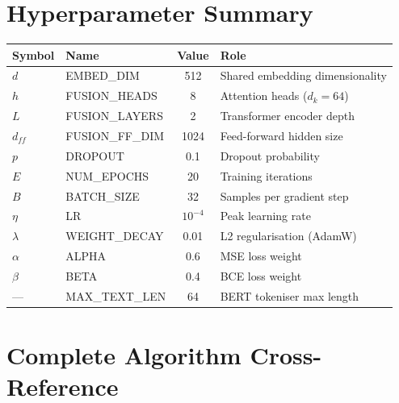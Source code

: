 \documentclass[12pt,a4paper]{article}
\theoremstyle{definition}
\begin{document}
\section{Hyperparameter Summary}

\begin{center}
\begin{tabular}{llcl}
\toprule
\textbf{Symbol} & \textbf{Name} & \textbf{Value} & \textbf{Role} \\
\midrule
$d$ & EMBED\_DIM & 512 & Shared embedding dimensionality \\
$h$ & FUSION\_HEADS & 8 & Attention heads ($d_k = 64$) \\
$L$ & FUSION\_LAYERS & 2 & Transformer encoder depth \\
$d_{ff}$ & FUSION\_FF\_DIM & 1024 & Feed-forward hidden size \\
$p$ & DROPOUT & 0.1 & Dropout probability \\
$E$ & NUM\_EPOCHS & 20 & Training iterations \\
$B$ & BATCH\_SIZE & 32 & Samples per gradient step \\
$\eta$ & LR & $10^{-4}$ & Peak learning rate \\
$\lambda$ & WEIGHT\_DECAY & 0.01 & L2 regularisation (AdamW) \\
$\alpha$ & ALPHA & 0.6 & MSE loss weight \\
$\beta$ & BETA & 0.4 & BCE loss weight \\
— & MAX\_TEXT\_LEN & 64 & BERT tokeniser max length \\
\bottomrule
\end{tabular}
\end{center}

\section{Complete Algorithm Cross-Reference}
\end{document}
